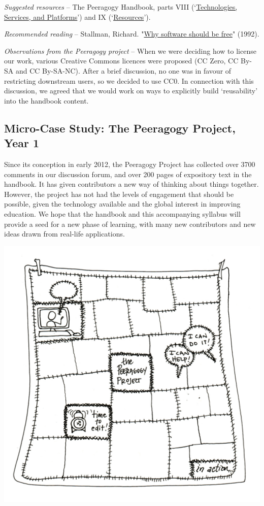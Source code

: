 \emph{Suggested resources} -- The Peeragogy Handbook, parts VIII
(`\href{http://peeragogy.org/resources/technologies/}{Technologies,
Services, and Platforms}') and IX
(`\href{http://peeragogy.org/resources/}{Resources}').

\emph{Recommended reading} -- Stallman, Richard.
"\href{http://www.gnu.org/philosophy/shouldbefree.html}{Why software
should be free}" (1992).

\emph{Observations from the Peeragogy project} -- When we were deciding
how to license our work, various Creative Commons licences were proposed
(CC Zero, CC By-SA and CC By-SA-NC). After a brief discussion, no one
was in favour of restricting downstream users, so we decided to use CC0.
In connection with this discussion, we agreed that we would work on ways
to explicitly build `reusability' into the handbook content.

\subsection{Micro-Case Study: The Peeragogy Project, Year 1}

Since its conception in early 2012, the Peeragogy Project has collected
over 3700 comments in our discussion forum, and over 200 pages of
expository text in the handbook. It has given contributors a new way of
thinking about things together. However, the project has not had the
levels of engagement that should be possible, given the technology
available and the global interest in improving education. We hope that
the handbook and this accompanying syllabus will provide a seed for a
new phase of learning, with many new contributors and new ideas drawn
from real-life applications.

\begin{center}
\includegraphics{./pictures/OpenBook-3.jpg}
\end{center}
